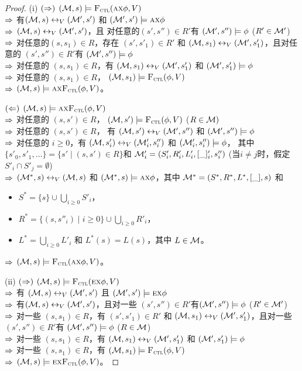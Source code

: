 \begin{proof}
	(i) $(\Rightarrow)$ $({\cal M},s)\models{\textsc{F}_{\textsc{ctl}}}(\textsc{a}\textsc{x}\phi,V)$\\
	$\Rightarrow$ 有$({\cal M},s)\leftrightarrow_V({\cal M}',s')$ 和 $({\cal M}',s')\models \textsc{a}\textsc{x}\phi$\\
	$\Rightarrow$  $({\cal M},s)\leftrightarrow_V({\cal M}',s')$，且 对任意的$(s',s'')\in R'$有 $({\cal M}',s'')\models \phi$  ($R'\in{\cal M}'$)\\
	$\Rightarrow$ 对任意的$(s,s_1)\in R$，存在 $(s',s'_1)\in R'$ 和 $({\cal M},s_1)\leftrightarrow_V({\cal M}',s'_1)$，且对任意的 $(s',s'')\in R'$有
	$({\cal M}',s'')\models \phi$\\
	$\Rightarrow$ 对任意的 $(s,s_1)\in R$，有 $({\cal M},s_1)\leftrightarrow_V({\cal M}',s'_1)$ 和 $({\cal M}',s'_1)\models\phi$\\
	$\Rightarrow$ 对任意的 $(s,s_1)\in R$， $({\cal M},s_1)\models{\textsc{F}_{\textsc{ctl}}}(\phi,V)$\\
	$\Rightarrow$ $({\cal M},s)\models\textsc{a}\textsc{x}{\textsc{F}_{\textsc{ctl}}}(\phi,V)$。
	
	$(\Leftarrow)$ $({\cal M},s)\models\textsc{a}\textsc{x}{\textsc{F}_{\textsc{ctl}}}(\phi,V)$\\
	$\Rightarrow$ 对任意的 $(s,s')\in R$， $({\cal M},s')\models{\textsc{F}_{\textsc{ctl}}}(\phi,V)$ ($R\in {\cal M})$\\
	$\Rightarrow$ 对任意的 $(s,s')\in R$， 有 $({\cal M},s')\leftrightarrow_V({\cal M}',s'')$ 和 $({\cal M}',s'')\models\phi$\\
	$\Rightarrow$ 对任意的 $i\ge 0$，有 $({\cal M},s'_i)\leftrightarrow_V({\cal M}'_i,s''_i)$ 和 $({\cal M}'_i,s''_i)\models\phi$，
	其中 $\{s'_0,s'_1,\ldots\}=\{s'\mid (s,s')\in R\}$和 ${\cal M}'_i=(S'_i,R'_i,L'_i,[\_]'_i,s''_i)$ (当$i\neq j$时，假定$S'_i\cap S'_j=\emptyset$)\\
	$\Rightarrow$ $({\cal M}^*,s)\leftrightarrow_V({\cal M},s)$ 和 $({\cal M}^*,s)\models\textsc{a}\textsc{x}\phi$，其中
	${\cal M}^*=(S^*,R^*,L^*,[\_], s)$ 和
	\begin{itemize}
		\item $S^*=\{s\}\cup\bigcup_{i\ge 0}S'_i$，
		\item $R^*=\{(s,s''_i)\mid i\ge 0\}\cup \bigcup_{i\ge 0} R'_i$，
		\item $L^*=\bigcup_{i\ge 0}L'_i$ 和 $L^*(s)=L(s)$，其中 $L\in{\cal M}$。
	\end{itemize}
	$\Rightarrow$ $({\cal M},s)\models {\textsc{F}_{\textsc{ctl}}}(\textsc{a}\textsc{x}\phi,V)$。
	
	(ii) $(\Rightarrow)$ $({\cal M},s)\models{\textsc{F}_{\textsc{ctl}}}(\textsc{e}\textsc{x}\phi,V)$\\
	$\Rightarrow$ 有 $({\cal M},s)\leftrightarrow_V({\cal M}',s')$ 且 $({\cal M}',s')\models \textsc{e}\textsc{x}\phi$\\
	$\Rightarrow$ 有$({\cal M},s)\leftrightarrow_V({\cal M}',s')$，且对一些 $(s',s'')\in R'$有$({\cal M}',s'')\models \phi$  ($R'\in{\cal M}'$)\\
	$\Rightarrow$ 对一些 $(s,s_1)\in R$，有 $(s',s'_1)\in R'$ 和 $({\cal M},s_1)\leftrightarrow_V({\cal M}',s'_1)$，且对一些$(s',s'')\in R'$有
	$({\cal M}',s'')\models \phi$ ($R\in {\cal M}$)\\
	$\Rightarrow$ 对一些 $(s,s_1)\in R$，有 $({\cal M},s_1)\leftrightarrow_V({\cal M}',s'_1)$ 和 $({\cal M}',s'_1)\models\phi$\\
	$\Rightarrow$ 对一些 $(s,s_1)\in R$，有 $({\cal M},s_1)\models{\textsc{F}_{\textsc{ctl}}}(\phi,V)$\\
	$\Rightarrow$ $({\cal M},s)\models\textsc{e}\textsc{x}{\textsc{F}_{\textsc{ctl}}}(\phi,V)$。
	

\end{proof}
